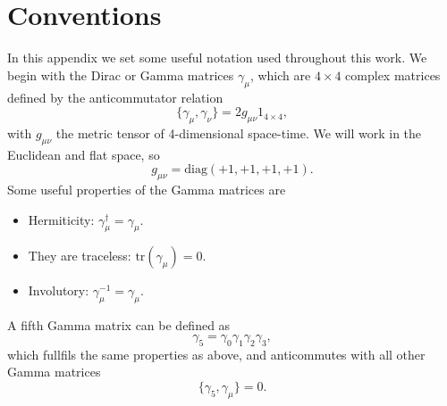 
\chapter{Conventions}
\label{appex_conventions}

In this appendix we set some useful notation used throughout this work. We begin with the Dirac or Gamma matrices $\gamma_{\mu}$, which are $4\times 4$ complex matrices defined by the anticommutator relation
\begin{equation}
\{\gamma_{\mu},\gamma_{\nu}\}=2g_{\mu\nu}1_{4\times 4},
\end{equation}
with $g_{\mu\nu}$ the metric tensor of 4-dimensional space-time. We will work in the Euclidean and flat space, so
\begin{equation}
g_{\mu\nu}=\textrm{diag}(+1,+1,+1,+1).
\end{equation}
Some useful properties of the Gamma matrices are
\begin{itemize}
\item Hermiticity: $\gamma_{\mu}^{\dagger}=\gamma_{\mu}$.
\item They are traceless: $\textrm{tr}(\gamma_{\mu})=0$.
\item Involutory: $\gamma_{\mu}^{-1}=\gamma_{\mu}$.
\end{itemize}
A fifth Gamma matrix can be defined as
\begin{equation}
\gamma_5=\gamma_0\gamma_1\gamma_2\gamma_3,
\end{equation}
which fullfils the same properties as above, and anticommutes with all other Gamma matrices
\begin{equation}
\{\gamma_5,\gamma_{\mu}\}=0.
\end{equation}

